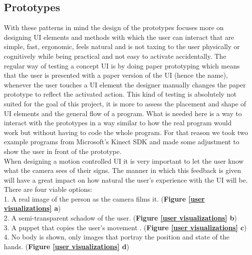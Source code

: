 \subsection{Prototypes}

With these patterns in mind the design of the prototypes focuses more on designing UI elements and methods with which the user can interact that are simple, fast, ergonomic, feels natural and is not taxing to the user physically or cognitively while being practical and not easy to activate accidentally. The regular way of testing a concept UI is by doing paper prototyping which means that the user is presented with a paper version of the UI (hence the name), whenever the user touches a UI element the designer manually changes the paper prototype to reflect the activated action. This kind of testing is absolutely not suited for the goal of this project, it is more to assess the placement and shape of UI elements and the general flow of a program. What is needed here is a way to interact with the prototypes in a way similar to how the real program would work but without having to code the whole program. For that reason we took two example programs from Microsoft's Kinect SDK and made some adjustment to show the user in front of the prototype.\\

When designing a motion controlled UI it is very important to let the user know what the camera sees of their signs. The manner in which this feedback is given will have a great impact on how natural the user's experience with the UI will be. There are four viable options: \\
 1. A real image of the person as the camera films it.   (\textbf{Figure \ref{user visualizations} a}) \\
 2. A semi-transparent schadow of the user. (\textbf{Figure \ref{user visualizations} b}) \\
 3. A puppet that copies the user's movement .  (\textbf{Figure \ref{user visualizations} c}) \\
 4. No body is shown, only images that portray the position and state of the hands. (\textbf{Figure \ref{user visualizations} d}) \\ \\
 
